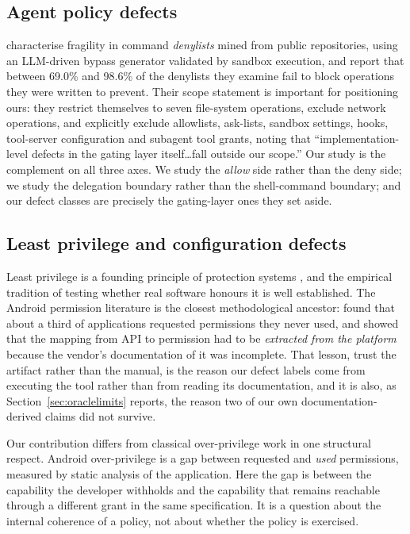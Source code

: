 \documentclass[smallextended,natbib]{svjour3}
\begin{document}
\subsection{Agent policy defects}

\citet{chen2026shellsieve} characterise fragility in command \emph{denylists} mined from public
repositories, using an LLM-driven bypass generator validated by sandbox execution, and report that
between 69.0\% and 98.6\% of the denylists they examine fail to block operations they were written to
prevent. Their scope statement is important for positioning ours: they restrict themselves to seven
file-system operations, exclude network operations, and explicitly exclude allowlists, ask-lists,
sandbox settings, hooks, tool-server configuration and subagent tool grants, noting that
``implementation-level defects in the gating layer itself\ldots fall outside our scope.'' Our study is
the complement on all three axes. We study the \emph{allow} side rather than the deny side; we study
the delegation boundary rather than the shell-command boundary; and our defect classes are precisely
the gating-layer ones they set aside.

\subsection{Least privilege and configuration defects}

Least privilege is a founding principle of protection systems \citep{saltzer1975protection}, and the
empirical tradition of testing whether real software honours it is well established. The Android
permission literature is the closest methodological ancestor: \citet{felt2011android} found that about
a third of applications requested permissions they never used, and \citet{au2012pscout} showed that
the mapping from API to permission had to be \emph{extracted from the platform} because the vendor's
documentation of it was incomplete. That lesson, trust the artifact rather than the manual, is the reason
our defect labels come from executing the tool rather than from reading its documentation, and it is
also, as Section~\ref{sec:oraclelimits} reports, the reason two of our own documentation-derived
claims did not survive.

Our contribution differs from classical over-privilege work in one structural respect. Android
over-privilege is a gap between requested and \emph{used} permissions, measured by static analysis of
the application. Here the gap is between the capability the developer withholds and the capability
that remains reachable through a different grant in the same specification. It is a question about
the internal coherence of a policy, not about whether the policy is exercised.
\end{document}
